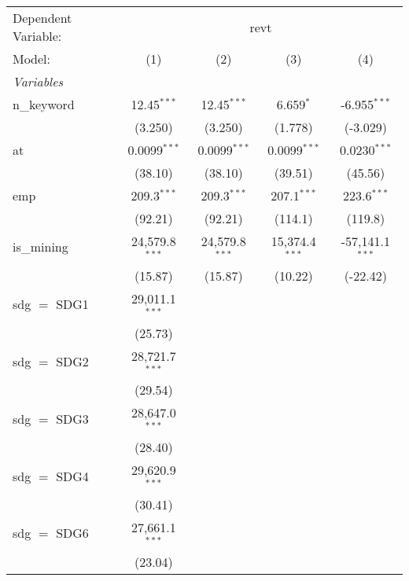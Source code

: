 
\begingroup
\centering
\begin{tabular}{lcccc}
   \tabularnewline \midrule \midrule
   Dependent Variable: & \multicolumn{4}{c}{revt}\\
   Model:        & (1)              & (2)              & (3)              & (4)\\  
   \midrule
   \emph{Variables}\\
   n\_keyword    & 12.45$^{***}$    & 12.45$^{***}$    & 6.659$^{*}$      & -6.955$^{***}$\\   
                 & (3.250)          & (3.250)          & (1.778)          & (-3.029)\\   
   at            & 0.0099$^{***}$   & 0.0099$^{***}$   & 0.0099$^{***}$   & 0.0230$^{***}$\\   
                 & (38.10)          & (38.10)          & (39.51)          & (45.56)\\   
   emp           & 209.3$^{***}$    & 209.3$^{***}$    & 207.1$^{***}$    & 223.6$^{***}$\\   
                 & (92.21)          & (92.21)          & (114.1)          & (119.8)\\   
   is\_mining    & 24,579.8$^{***}$ & 24,579.8$^{***}$ & 15,374.4$^{***}$ & -57,141.1$^{***}$\\   
                 & (15.87)          & (15.87)          & (10.22)          & (-22.42)\\   
   sdg $=$ SDG1  & 29,011.1$^{***}$ &                  &                  &   \\   
                 & (25.73)          &                  &                  &   \\   
   sdg $=$ SDG2  & 28,721.7$^{***}$ &                  &                  &   \\   
                 & (29.54)          &                  &                  &   \\   
   sdg $=$ SDG3  & 28,647.0$^{***}$ &                  &                  &   \\   
                 & (28.40)          &                  &                  &   \\   
   sdg $=$ SDG4  & 29,620.9$^{***}$ &                  &                  &   \\   
                 & (30.41)          &                  &                  &   \\   
   sdg $=$ SDG6  & 27,661.1$^{***}$ &                  &                  &   \\   
                 & (23.04)          &                  &                  &   \\   

\end{tabular}
